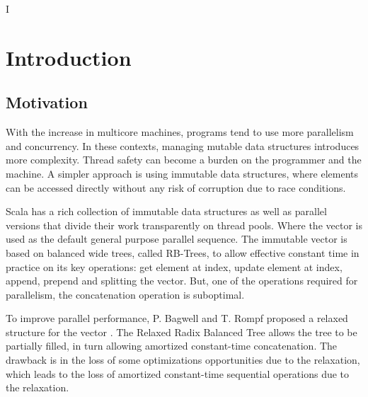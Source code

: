 I%
\lhead{} 

\chapter{Introduction} %
\label{Introduction} %



\section{Motivation}
With the increase in multicore machines, programs tend to use more parallelism and concurrency. In these contexts, managing mutable data structures introduces more complexity. Thread safety can become a burden on the programmer and the machine. A simpler approach is using immutable data structures, where elements can be accessed directly without any risk of corruption due to race conditions. 


Scala has a rich collection of immutable data structures as well as parallel versions that divide their work transparently on thread pools. Where the vector is used as the default general purpose parallel sequence. The immutable vector is based on balanced wide trees, called RB-Trees, to allow effective constant time in practice on its key operations: get element at index, update element at index, append, prepend and splitting the vector. But, one of the operations required for parallelism, the concatenation operation is suboptimal.

To improve parallel performance, P. Bagwell and T. Rompf proposed a relaxed structure for the vector \cite{RRBTrees}. The Relaxed Radix Balanced Tree allows the tree to be partially filled, in turn allowing amortized constant-time concatenation. The drawback is in the loss of some optimizations opportunities due to the relaxation, which leads to the loss of amortized constant-time sequential operations due to the relaxation.


